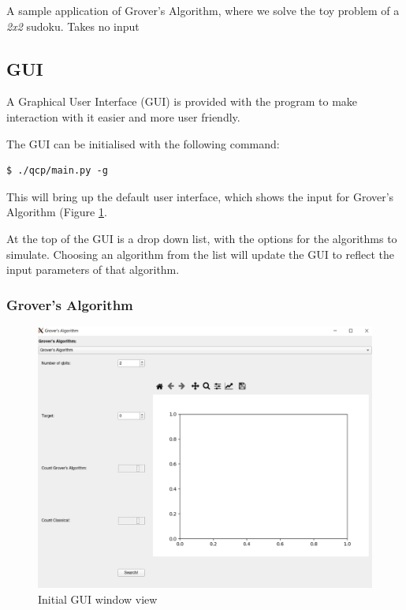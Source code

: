 \documentclass{article}
\begin{document}
A sample application of Grover's Algorithm, where we solve the toy problem of a \textit{2x2} sudoku. Takes no input

\pagebreak

\subsection{GUI}

A Graphical User Interface (GUI) is provided with the program to make interaction with it easier and more user friendly.

The GUI can be initialised with the following command:

\begin{verbatim}
$ ./qcp/main.py -g
\end{verbatim}

This will bring up the default user interface, which shows the input for Grover's Algorithm (Figure \ref{fig:gui-overview-grover}.

At the top of the GUI is a drop down list, with the options for the algorithms to simulate.
Choosing an algorithm from the list will update the GUI to reflect the input parameters of that algorithm.

\subsubsection{Grover's Algorithm}

\begin{figure}[H]
\includegraphics[width=15cm]{docs/images/gui_overview_grovers.png}
\caption{\label{fig:gui-overview-grover} Initial GUI window view}
\end{figure}
\end{document}
